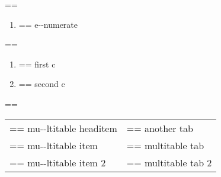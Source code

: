 \documentclass{book}
\makeatletter
\newenvironment{Texinfopreformatted}{%
  \par\GNUTobeylines\obeyspaces\frenchspacing\parskip=\z@\parindent=\z@}{}
{\catcode`\^^M=13 \gdef\GNUTobeylines{\catcode`\^^M=13 \def^^M{\null\par}}}
\newenvironment{Texinfoindented}{\begin{list}{}{}\item\relax}{\end{list}}
\renewcommand{\_}{\Texinfounderscore\discretionary{}{}{}}
\makeatother
\begin{document}
\begin{Texinfoindented}
\begin{enumerate}[start=3]
\end{enumerate}
\begin{Texinfopreformatted}%
\ttfamily 
\end{Texinfopreformatted}
\begin{enumerate}[label=\alph*.]
\item \begin{Texinfopreformatted}%
\ttfamily e{-}{-}numerate
\end{Texinfopreformatted}
\end{enumerate}
\begin{Texinfopreformatted}%
\ttfamily 
\end{Texinfopreformatted}
\begin{enumerate}[label=\alph*.,start=3]
\item \begin{Texinfopreformatted}%
\ttfamily first c
\end{Texinfopreformatted}
\item \begin{Texinfopreformatted}%
\ttfamily second c
\end{Texinfopreformatted}
\end{enumerate}
\begin{Texinfopreformatted}%
\ttfamily 
\end{Texinfopreformatted}
\begin{tabular}{m{} m{}}%
\begin{Texinfopreformatted}%
\ttfamily mu{-}{-}ltitable headitem \end{Texinfopreformatted}&
\begin{Texinfopreformatted}%
\ttfamily another tab
\end{Texinfopreformatted}\\
\begin{Texinfopreformatted}%
\ttfamily mu{-}{-}ltitable item \end{Texinfopreformatted}&
\begin{Texinfopreformatted}%
\ttfamily multitable tab
\end{Texinfopreformatted}\\
\begin{Texinfopreformatted}%
\ttfamily mu{-}{-}ltitable item 2 \end{Texinfopreformatted}&
\begin{Texinfopreformatted}%
\ttfamily multitable tab 2
\index[cp]{index entry within multitable@index entry within multitable}%
\end{Texinfopreformatted}\\

\end{tabular}
\end{Texinfoindented}
\end{document}
